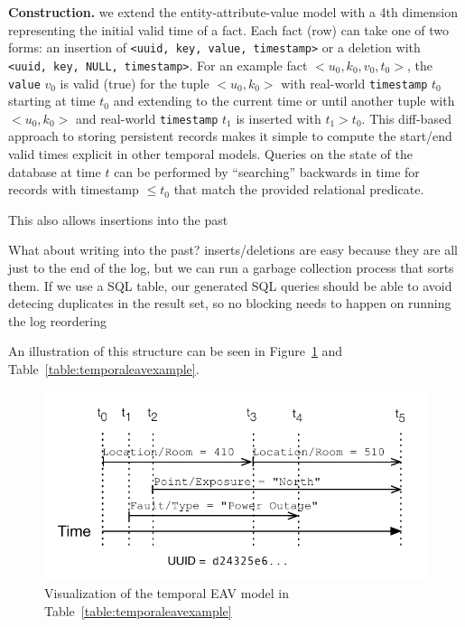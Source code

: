 \textbf{Construction.} we extend the entity-attribute-value model with a 4th dimension representing the initial
valid time of a fact. Each fact (row) can take one of two forms: an insertion of \texttt{<uuid, key, value, timestamp>}
or a deletion with \texttt{<uuid, key, NULL, timestamp>}. For an example fact $<u_0, k_0, v_0, t_0>$, the \texttt{value} $v_0$ is valid (true) for the tuple $<u_0, k_0>$
with real-world \texttt{timestamp} $t_0$ starting at time $t_0$ and extending to the current time or until another
tuple with $<u_0, k_0>$ and real-world \texttt{timestamp} $t_1$ is inserted with $t_1 > t_0$. This diff-based approach
to storing persistent records makes it simple to compute the start/end valid times explicit in other temporal models.
Queries on the state of the database at time $t$ can be performed by ``searching'' backwards in time for 
records with timestamp $\leq t_0$ that match the provided relational predicate.

This also allows insertions into the past

What about writing into the past? inserts/deletions are easy because they are all just to the end of the log, but
we can run a garbage collection process that sorts them. If we use a SQL table, our generated SQL queries should
be able to avoid detecing duplicates in the result set, so no blocking needs to happen on running the log reordering
\fi

An illustration of this structure can be seen in Figure~\ref{figure:temporaleavexample} and Table~\ref{table:temporaleavexample}.

\begin{figure}
\centering
\includegraphics[width=.9\linewidth]{figs/time.pdf}
\caption{Visualization of the temporal EAV model in Table~\ref{table:temporaleavexample}}
\label{figure:temporaleavexample}
\end{figure}

